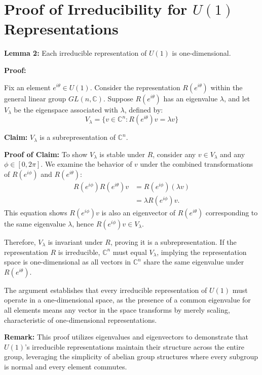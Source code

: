 \documentclass{article}
\begin{document}
\section*{Proof of Irreducibility for \(U(1)\) Representations}

\textbf{Lemma 2:} Each irreducible representation of \(U(1)\) is one-dimensional.

\textbf{Proof:}

Fix an element \( e^{i\theta} \in U(1) \). Consider the representation \( R(e^{i\theta}) \) within the general linear group \( GL(n, \mathbb{C}) \). Suppose \( R(e^{i\theta}) \) has an eigenvalue \(\lambda\), and let \( V_\lambda \) be the eigenspace associated with \(\lambda\), defined by:
\[
V_\lambda = \{ v \in \mathbb{C}^n : R(e^{i\theta}) v = \lambda v \}
\]

\textbf{Claim:} \(V_\lambda\) is a subrepresentation of \(\mathbb{C}^n\).

\textbf{Proof of Claim:}
To show \(V_\lambda\) is stable under \(R\), consider any \(v \in V_\lambda\) and any \( \phi \in [0, 2\pi] \). We examine the behavior of \( v \) under the combined transformations of \( R(e^{i\phi}) \) and \( R(e^{i\theta}) \):
\[
\begin{aligned}
R(e^{i\phi}) R(e^{i\theta}) v &= R(e^{i\phi}) (\lambda v) \\
&= \lambda R(e^{i\phi}) v.
\end{aligned}
\]
This equation shows \( R(e^{i\phi}) v \) is also an eigenvector of \( R(e^{i\theta}) \) corresponding to the same eigenvalue \(\lambda\), hence \( R(e^{i\phi}) v \in V_\lambda \).

Therefore, \(V_\lambda\) is invariant under \( R \), proving it is a subrepresentation. If the representation \( R \) is irreducible, \( \mathbb{C}^n \) must equal \( V_\lambda \), implying the representation space is one-dimensional as all vectors in \(\mathbb{C}^n\) share the same eigenvalue under \( R(e^{i\theta}) \).

The argument establishes that every irreducible representation of \( U(1) \) must operate in a one-dimensional space, as the presence of a common eigenvalue for all elements means any vector in the space transforms by merely scaling, characteristic of one-dimensional representations.

\textbf{Remark:}
This proof utilizes eigenvalues and eigenvectors to demonstrate that \(U(1)\)'s irreducible representations maintain their structure across the entire group, leveraging the simplicity of abelian group structures where every subgroup is normal and every element commutes.
\end{document}
